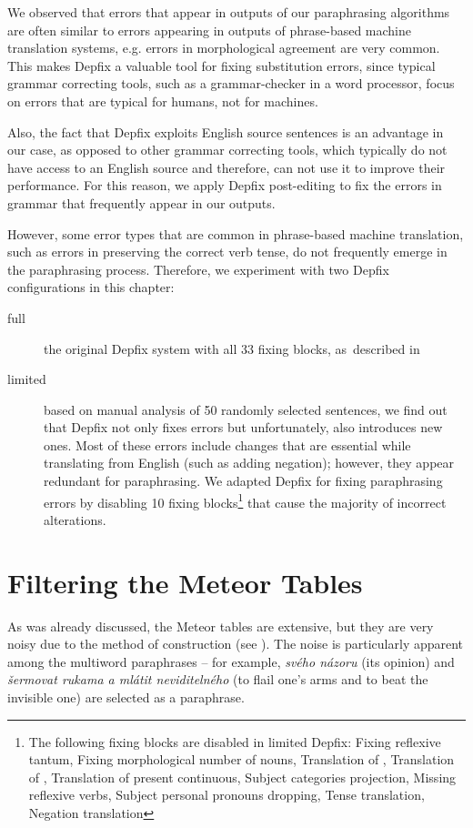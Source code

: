 We observed that errors that appear in outputs of our paraphrasing algorithms 
are often similar to errors appearing in outputs of phrase-based machine 
translation systems, e.g. errors in morphological agreement are very common.
This makes Depfix a valuable tool for fixing substitution errors, since typical
grammar correcting tools, such as a grammar-checker in a word processor,
focus on errors that are typical for humans, not for machines.

Also, the fact that Depfix exploits English source sentences is an advantage 
in our case, as opposed to other grammar correcting tools, which typically do 
not have access to an English source and therefore, can not use it to improve 
their performance. For this reason, we apply Depfix post-editing to fix the 
errors in grammar that frequently appear in our outputs.

However, some error types that are common in phrase-based machine translation, 
such as errors in preserving the correct verb tense, do not frequently emerge in the 
paraphrasing process. Therefore, we experiment with two Depfix configurations 
in this chapter:
\begin{description}
\item[full] the original Depfix system with all 33 fixing blocks,
as~described in \cite{rosa:mgr}
\item[limited] based on manual analysis of 50 randomly selected sentences, we find out that Depfix not only fixes errors but unfortunately, also introduces new ones. 
Most of these errors include changes that are essential while translating from English (such as adding negation); however, they appear redundant for paraphrasing. 
We adapted Depfix for fixing paraphrasing errors by disabling 10 fixing blocks\footnote{The following fixing blocks are disabled
in limited Depfix: Fixing reflexive tantum, Fixing morphological number of nouns, Translation of , Translation of , Translation of 
present continuous, Subject categories projection, Missing reflexive verbs, Subject personal pronouns dropping, Tense translation, Negation translation}
that cause the majority of incorrect alterations.
\end{description}


\section{Filtering the Meteor Tables}
\label{filtering-section}
As was already discussed, the Meteor tables are extensive, but they are very noisy due to the method of construction  (see ). 
The noise is particularly apparent among the multiword paraphrases -- for example, \textit{svého názoru}  (its opinion) and \textit{šermovat rukama a mlátit neviditelného} (to flail one's arms and to beat the invisible one) are selected as a paraphrase. 

